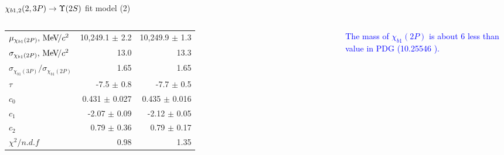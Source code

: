 \begin{frame}{$\chi_{b1,2}(2,3P) \to \TwoS$ fit model (2)}
\begin{columns}[T]
{\begin{tabular}{lrr}
\rule{0pt}{4ex}$\mu_{\chi_{b 1}(2P)}, {\mathrm{\,Me\kern -0.1em V\!/}c^2}$ & 10,249.1 $\pm$ 2.2 & 10,249.9 $\pm$ 1.3\\
$\sigma_{\chi_{b 1}(2P)}, {\mathrm{\,Me\kern -0.1em V\!/}c^2}$ & 13.0 & 13.3\\
$\sigma_{\chi_{b1}(3P)} / \sigma_{\chi_{b1}(2P)}$ & 1.65 & 1.65\\

\rule{0pt}{4ex}$\tau$ & -7.5 $\pm$ 0.8 & -7.7 $\pm$ 0.5\\
$c_0$ & 0.431 $\pm$ 0.027 & 0.435 $\pm$ 0.016\\
$c_1$ & -2.07 $\pm$ 0.09 & -2.12 $\pm$ 0.05\\
$c_2$ & 0.79 $\pm$ 0.36 & 0.79 $\pm$ 0.17\\

\rule{0pt}{4ex}$\chi^2 / n.d.f$ & 0.98 & 1.35\\
\bottomrule
\end{tabular}
} %

\bigskip
{\tiny \textcolor{blue}{The mass of $\chi_{b1}(2P)$  is about 6 \mevcc  less than value in PDG (10.25546 \gevcc).}}
\end{columns}


\end{frame}
